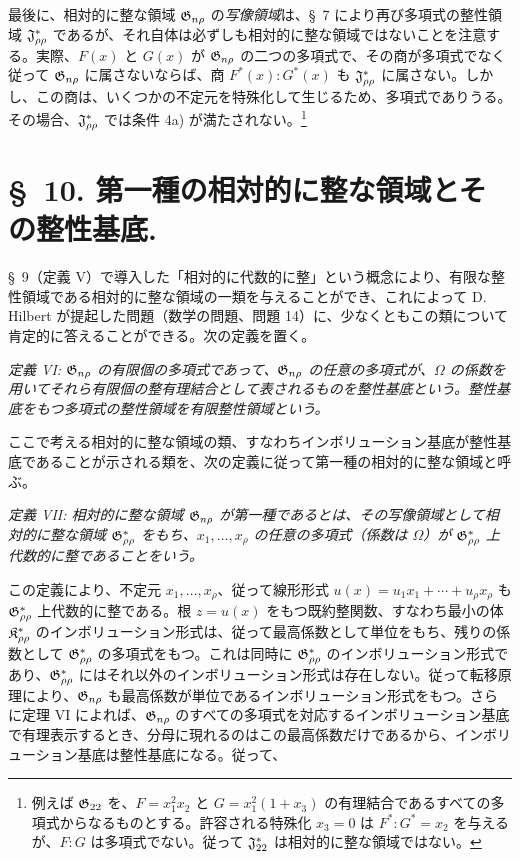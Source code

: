 \documentclass[11pt]{article}
\begin{document}
最後に、相対的に整な領域 $\mathfrak{G}_{n\rho}$ の\emph{写像領域}は、\S\ 7 により再び多項式の整性領域 $\mathfrak{J}^*_{\rho\rho}$ であるが、それ自体は必ずしも相対的に整な領域ではないことを注意する。実際、$F(x)$ と $G(x)$ が $\mathfrak{G}_{n\rho}$ の二つの多項式で、その商が多項式でなく従って $\mathfrak{G}_{n\rho}$ に属さないならば、商 $F^*(x):G^*(x)$ も $\mathfrak{J}^*_{\rho\rho}$ に属さない。しかし、この商は、いくつかの不定元を特殊化して生じるため、多項式でありうる。その場合、$\mathfrak{J}^*_{\rho\rho}$ では条件 4a) が満たされない。\footnote{例えば $\mathfrak{G}_{22}$ を、$F=x_1^2x_2$ と $G=x_1^2(1+x_3)$ の有理結合であるすべての多項式からなるものとする。許容される特殊化 $x_3=0$ は $F^*:G^*=x_2$ を与えるが、$F:G$ は多項式でない。従って $\mathfrak{J}^*_{22}$ は相対的に整な領域ではない。}

\section*{\S\ 10. 第一種の相対的に整な領域とその整性基底.}

\S\ 9（定義 V）で導入した「相対的に代数的に整」という概念により、有限な整性領域である相対的に整な領域の一類を与えることができ、これによって D. Hilbert が提起した問題（数学の問題、問題 14）に、少なくともこの類について肯定的に答えることができる。次の定義を置く。

\emph{定義 VI: $\mathfrak{G}_{n\rho}$ の有限個の多項式であって、$\mathfrak{G}_{n\rho}$ の任意の多項式が、$\Omega$ の係数を用いてそれら有限個の整有理結合として表されるものを整性基底という。整性基底をもつ多項式の整性領域を有限整性領域という。}

ここで考える相対的に整な領域の類、すなわちインボリューション基底が整性基底であることが示される類を、次の定義に従って第一種の相対的に整な領域と呼ぶ。

\emph{定義 VII: 相対的に整な領域 $\mathfrak{G}_{n\rho}$ が第一種であるとは、その写像領域として相対的に整な領域 $\mathfrak{G}^*_{\rho\rho}$ をもち、$x_1,\ldots,x_\rho$ の任意の多項式（係数は $\Omega$）が $\mathfrak{G}^*_{\rho\rho}$ 上代数的に整であることをいう。}

この定義により、不定元 $x_1,\ldots,x_\rho$、従って線形形式 $u(x)=u_1x_1+\cdots+u_\rho x_\rho$ も $\mathfrak{G}^*_{\rho\rho}$ 上代数的に整である。根 $z=u(x)$ をもつ既約整関数、すなわち最小の体 $\mathfrak{K}^*_{\rho\rho}$ のインボリューション形式は、従って最高係数として単位をもち、残りの係数として $\mathfrak{G}^*_{\rho\rho}$ の多項式をもつ。これは同時に $\mathfrak{G}^*_{\rho\rho}$ のインボリューション形式であり、$\mathfrak{G}^*_{\rho\rho}$ にはそれ以外のインボリューション形式は存在しない。従って転移原理により、$\mathfrak{G}_{n\rho}$ も最高係数が単位であるインボリューション形式をもつ。さらに定理 VI によれば、$\mathfrak{G}_{n\rho}$ のすべての多項式を対応するインボリューション基底で有理表示するとき、分母に現れるのはこの最高係数だけであるから、インボリューション基底は整性基底になる。従って、
\end{document}
